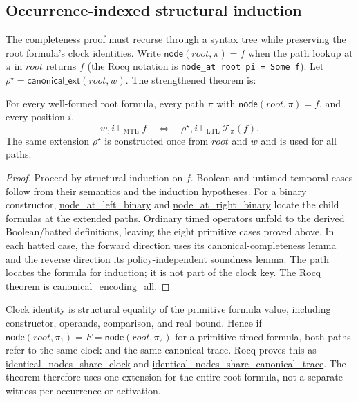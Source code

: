 \documentclass[manuscript]{acmart}
\newcommand{\satM}{\models_{\mathrm{MTL}}}
\newcommand{\satL}{\models_{\mathrm{LTL}}}
\newcommand{\T}{\mathcal{T}}
\newcommand{\Rocqid}[1]{\url{#1}}
\begin{document}
\subsection{Occurrence-indexed structural induction}
\label{subsec:occurrence-induction}
The completeness proof must recurse through a syntax tree while preserving
the root formula's clock identities. Write
$\mathsf{node}(root,\pi)=f$ when the path lookup at $\pi$ in $root$
returns $f$ (the Rocq notation is
\texttt{node\_at root pi = Some f}). Let
$\rho^\star=\mathsf{canonical\_ext}(root,w)$. The strengthened theorem is:
\begin{theorem}
\label{thm:canonical-all}
For every well-formed root formula, every path $\pi$ with
$\mathsf{node}(root,\pi)=f$, and every position $i$,
\[
w,i\satM f
\quad\Longleftrightarrow\quad
\rho^\star,i\satL\T_\pi(f).
\]
The same extension $\rho^\star$ is constructed once from $root$ and $w$ and
is used for all paths.
\end{theorem}
\begin{proof}
Proceed by structural induction on $f$. Boolean and untimed temporal cases
follow from their semantics and the induction hypotheses. For a binary
constructor, \Rocqid{node_at_left_binary} and
\Rocqid{node_at_right_binary} locate the child formulas at the extended
paths. Ordinary timed operators unfold to the derived Boolean/hatted
definitions, leaving the eight primitive cases proved above. In each hatted
case, the forward direction uses its canonical-completeness lemma and the
reverse direction its policy-independent soundness lemma. The path locates
the formula for induction; it is not part of the clock key. The Rocq theorem
is \Rocqid{canonical_encoding_all}.
\end{proof}

Clock identity is structural equality of the primitive formula value,
including constructor, operands, comparison, and real bound. Hence if
$\mathsf{node}(root,\pi_1)=F=\mathsf{node}(root,\pi_2)$ for a primitive
timed formula, both paths refer to the same clock and the same canonical
trace. Rocq proves this as \Rocqid{identical_nodes_share_clock} and
\Rocqid{identical_nodes_share_canonical_trace}. The theorem therefore
uses one extension for the entire root formula, not a separate witness per
occurrence or activation.
\end{document}
